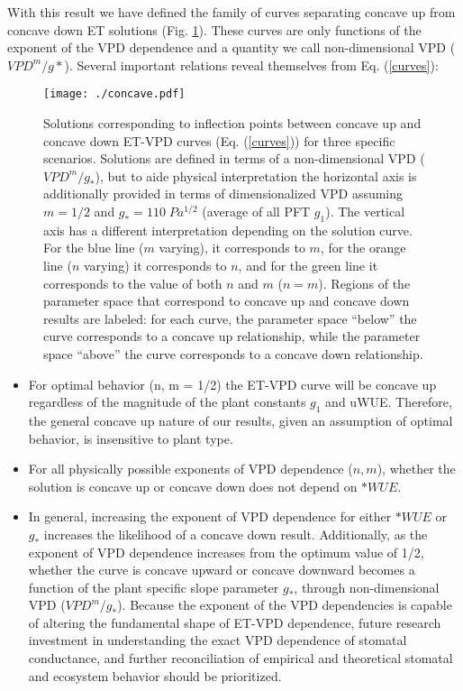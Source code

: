 \documentclass[12pt]{article}
\begin{document}
With this result we have defined the family of curves separating
concave up from concave down ET solutions (Fig. \ref{concave}). These
curves are only functions of the exponent of the VPD dependence and a
quantity we call non-dimensional VPD ($VPD^m/g*$). Several important
relations reveal themselves from Eq. (\ref{curves}):

\begin{figure}
  \centering
  \centerline{\texttt{[image: ./concave.pdf]}}
  \caption{ Solutions corresponding to inflection points between
    concave up and concave down ET-VPD curves (Eq. (\ref{curves})) for
    three specific scenarios. Solutions are defined in terms of a
    non-dimensional VPD ($VPD^m/g_*$), but to aide physical
    interpretation the horizontal axis is additionally provided in
    terms of dimensionalized VPD assuming $m=1/2$ and
    $g_*=110\; Pa^{1/2}$ (average of all PFT $g_1$). The vertical axis
    has a different interpretation depending on the solution
    curve. For the blue line ($m$ varying), it corresponds to $m$, for
    the orange line ($n$ varying) it corresponds to $n$, and for the
    green line it corresponds to the value of both $n$ and $m$
    ($n=m$). Regions of the parameter space that correspond to concave
    up and concave down results are labeled: for each curve, the
    parameter space ``below'' the curve corresponds to a concave up
    relationship, while the parameter space ``above'' the curve
    corresponds to a concave down relationship.}
  \label{concave}
\end{figure}

\begin{itemize}
  \item For optimal behavior (n, m = 1/2) the ET-VPD curve will be
    concave up regardless of the magnitude of the plant constants
    $g_1$ and uWUE. Therefore, the general concave up nature of our
    results, given an assumption of optimal behavior, is insensitive
    to plant type.
  \item For all physically possible exponents of VPD dependence ($n,
    m$), whether the solution is concave up or concave down does not
    depend on $*WUE$.
  \item In general, increasing the exponent of VPD dependence for
    either $*WUE$ or $g_*$ increases the likelihood of a concave down
    result. Additionally, as the exponent of VPD dependence increases
    from the optimum value of 1/2, whether the curve is concave upward
    or concave downward becomes a function of the plant specific slope
    parameter $g_*$, through non-dimensional VPD
    ($VPD^m/g_*$). Because the exponent of the VPD dependencies is
    capable of altering the fundamental shape of ET-VPD dependence,
    future research investment in understanding the exact VPD
    dependence of stomatal conductance, and further reconciliation of
    empirical and theoretical stomatal and ecosystem behavior should
    be prioritized.
\end{itemize}
\end{document}
